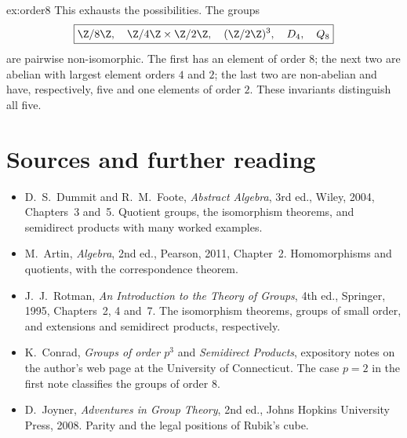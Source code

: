 \begin{solution}{ex:order8}
This exhausts the possibilities. The groups
\[
\boxed{\Z/8\Z,\quad\Z/4\Z\times\Z/2\Z,\quad
(\Z/2\Z)^3,\quad D_4,\quad Q_8}
\]
are pairwise non-isomorphic. The first has an element of order $8$; the next two are abelian with largest element orders $4$ and $2$; the last two are non-abelian and have, respectively, five and one elements of order $2$. These invariants distinguish all five.
\end{solution}

\section*{Sources and further reading}

\begin{itemize}
\item D.~S.~Dummit and R.~M.~Foote, \emph{Abstract Algebra}, 3rd ed., Wiley, 2004, Chapters~3 and~5. Quotient groups, the isomorphism theorems, and semidirect products with many worked examples.
\item M.~Artin, \emph{Algebra}, 2nd ed., Pearson, 2011, Chapter~2. Homomorphisms and quotients, with the correspondence theorem.
\item J.~J.~Rotman, \emph{An Introduction to the Theory of Groups}, 4th ed., Springer, 1995, Chapters~2, 4 and~7. The isomorphism theorems, groups of small order, and extensions and semidirect products, respectively.
\item K.~Conrad, \emph{Groups of order $p^3$} and \emph{Semidirect Products}, expository notes on the author's web page at the University of Connecticut. The case $p=2$ in the first note classifies the groups of order $8$.
\item D.~Joyner, \emph{Adventures in Group Theory}, 2nd ed., Johns Hopkins University Press, 2008. Parity and the legal positions of Rubik's cube.
\end{itemize}
